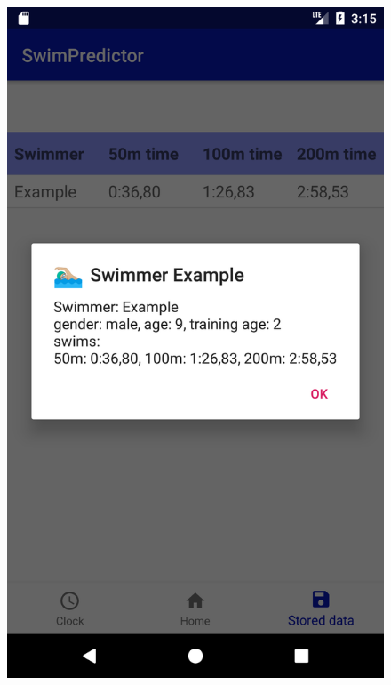 \begin{figure}[ht]
\begin{minipage}{0.15\textwidth}
\includegraphics[width=\textwidth]{visualisation/app_detailed_information.png}
\end{minipage}
\begin{minipage}{0.15\textwidth}

\end{minipage}
\end{figure}
